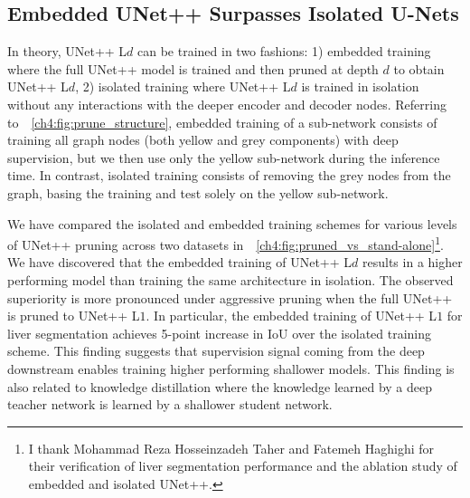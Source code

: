 \subsection{Embedded UNet++ Surpasses Isolated U-Nets}
\label{ch4:embedded_vs_isolated_training}

In theory, UNet++ L$d$ can be trained in two fashions: 1) embedded training where the full UNet++ model is trained and then pruned at depth $d$ to obtain UNet++ L$d$, 2) isolated training where UNet++ L$d$ is trained in isolation without any interactions with the deeper encoder and decoder nodes. Referring to~\figurename~\ref{ch4:fig:prune_structure}, embedded training of a sub-network consists of training all graph nodes (both yellow and grey components) with deep supervision, but we then use only the yellow sub-network during the inference time. In contrast, isolated training consists of removing the grey nodes from the graph, basing the training and test solely on the yellow sub-network.

We have compared the isolated and embedded training schemes for various levels of UNet++ pruning across two datasets in~\figurename~\ref{ch4:fig:pruned_vs_stand-alone}\footnote{I thank Mohammad Reza Hosseinzadeh Taher and Fatemeh Haghighi for their verification of liver segmentation performance and the ablation study of embedded and isolated UNet++.}. We have discovered that the embedded training of UNet++ L$d$ results in a higher performing model than training the same architecture in isolation. The observed superiority is more pronounced under aggressive pruning when the full UNet++ is pruned to UNet++ L$1$. In particular, the embedded training of UNet++ L$1$ for liver segmentation achieves 5-point increase in IoU over the isolated training scheme. This finding suggests that supervision signal coming from the deep downstream enables training higher performing shallower models. This finding is also related to knowledge distillation where the knowledge learned by a deep teacher network is learned by a shallower student network.

